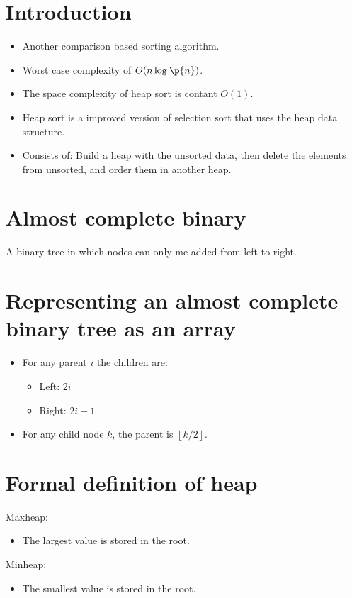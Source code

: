 \section{Introduction}
\begin{itemize}
    \item Another comparison based sorting algorithm.
    \item Worst case complexity of $O(n\log_{}\p{ n } )$. 
    \item The space complexity of heap sort is contant $O(1)$.
    \item Heap sort is a improved version of selection sort that uses the heap data structure.
    \item Consists of: Build a heap with the unsorted data, then delete the elements from unsorted, and order them in another heap.
\end{itemize}

\section{Almost complete binary}
A binary tree in which nodes can only me added from left to right. 


\section{Representing an almost complete binary tree as an array}
\begin{itemize}
    \item For any parent $i$ the children are: 
        \begin{itemize}
            \item Left: $2i$ 
            \item Right: $2i+1$ 
        \end{itemize}
    
    \item For any child node $k$, the parent is $\left\lfloor k/2 \right\rfloor$.
\end{itemize}

\section{Formal definition of heap}
Maxheap:
\begin{itemize}
    \item The largest value is stored in the root.
\end{itemize}
Minheap: 
\begin{itemize}
    \item The smallest value is stored in the root.
\end{itemize}

